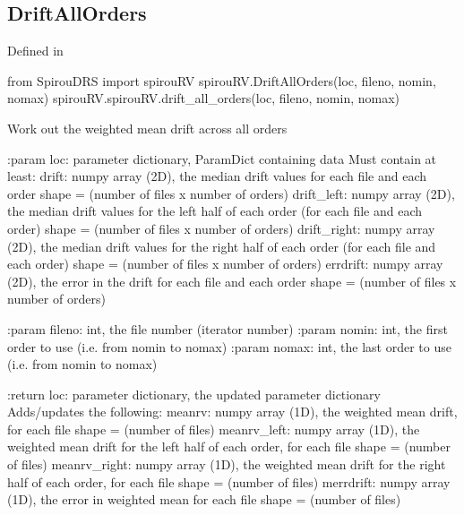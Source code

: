 \noindent\begin{minipage}{\textwidth}
\subsection{DriftAllOrders}

Defined in \spirouRV{}

\begin{pythonbox}
from SpirouDRS import spirouRV
spirouRV.DriftAllOrders(loc, fileno, nomin, nomax)
spirouRV.spirouRV.drift_all_orders(loc, fileno, nomin, nomax)
\end{pythonbox}

\begin{pythondocstring}
Work out the weighted mean drift across all orders

:param loc: parameter dictionary, ParamDict containing data
        Must contain at least:
            drift: numpy array (2D), the median drift values for each
                   file and each order
                   shape = (number of files x number of orders)
            drift_left: numpy array (2D), the median drift values for the
                        left half of each order (for each file and each
                        order)
                        shape = (number of files x number of orders)
            drift_right: numpy array (2D), the median drift values for the
                         right half of each order (for each file and each
                         order)
                         shape = (number of files x number of orders)
            errdrift: numpy array (2D), the error in the drift for each
                      file and each order
                      shape = (number of files x number of orders)

:param fileno: int, the file number (iterator number)
:param nomin: int, the first order to use (i.e. from nomin to nomax)
:param nomax: int, the last order to use (i.e. from nomin to nomax)

:return loc: parameter dictionary, the updated parameter dictionary
        Adds/updates the following:
            meanrv: numpy array (1D), the weighted mean drift, for each file
                    shape = (number of files)
            meanrv_left: numpy array (1D), the weighted mean drift for the
                         left half of each order, for each file
                         shape = (number of files)
            meanrv_right: numpy array (1D), the weighted mean drift for the
                          right half of each order, for each file
                          shape = (number of files)
            merrdrift: numpy array (1D), the error in weighted mean for
                       each file
                       shape = (number of files)
\end{pythondocstring}
\end{minipage}

